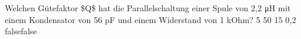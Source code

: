     {Welchen Gütefaktor \$Q\$ hat die Parallelschaltung einer Spule von 2,2 μH mit einem Kondensator von 56 pF und einem Widerstand von 1 kOhm?}
    {5}
    {50}
    {15}
    {0,2}
    {false}{false}